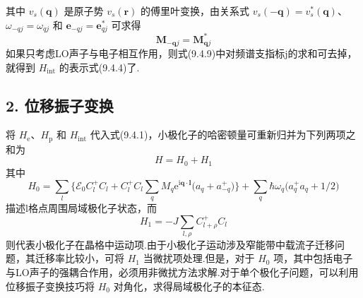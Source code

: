 其中 $v_{s}(\boldsymbol{q})$ 是原子势 $v_{s}(\boldsymbol{r})$ 的傅里叶变换，由关系式
$v_{s}(-\boldsymbol{q})=v_{s}^{*}(\boldsymbol{q})$、$\omega_{-qj}=\omega_{qj}$ 和
$\boldsymbol{e}_{-qj}=\boldsymbol{e}_{qj}^{*}$ 可求得
\begin{equation*}
  \boldsymbol{M}_{-\boldsymbol{q}j}=\boldsymbol{M}_{\boldsymbol{q}j}^{*}
\end{equation*}
如果只考虑LO声子与电子相互作用，则式(9.4.9)中对频谱支指标j的求和可去掉，就得到 $H_{\mathrm{int}}$ 的表示式(9.4.4)了.

\subsection*{2. 位移振子变换}

将 $H_{\mathrm e}$、$H_{\mathrm p}$ 和 $H_{\mathrm{int}}$ 代入式(9.4.1)，小极化子的哈密顿量可重新归并为下列两项之和为
\begin{equation}
  H=H_{0}+H_{1}
\end{equation}
其中
\begin{equation}
  H_{0}=\sum_{l}\biggl\{\mathscr{E}_{0}C_{l}^{+}C_{l}
  +C_{l}^{+}C_{l}\sum_{q}M_{q}\mathrm{e}^{\mathrm{i}\boldsymbol{q}\cdot\boldsymbol{l}}
  \bigl(a_{q}+a_{-q}^{+}\bigr)\biggr\}
  +\sum_{q}\hbar\omega_{q}\bigl(a_{q}^{+}a_{q}+1/2\bigr)
\end{equation}
描述l格点周围局域极化子状态，而
\begin{equation}
  H_{1}=-J\sum_{l,\rho}C_{l+\rho}^{+}C_{l}
\end{equation}
则代表小极化子在晶格中运动项.由于小极化子运动涉及窄能带中载流子迁移问题，其迁移率比较小，可将 $H_{1}$ 当微扰项处理.但是，对于 $H_{0}$ 项，其中包括电子与LO声子的强耦合作用，必须用非微扰方法求解.对于单个极化子问题，可以利用位移振子变换技巧将 $H_{0}$ 对角化，求得局域极化子的本征态.

